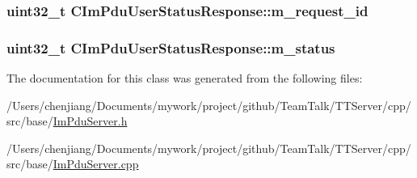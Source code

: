 \subsubsection[{m\+\_\+request\+\_\+id}]{\setlength{\rightskip}{0pt plus 5cm}uint32\+\_\+t C\+Im\+Pdu\+User\+Status\+Response\+::m\+\_\+request\+\_\+id\hspace{0.3cm}{\ttfamily [private]}}\label{class_c_im_pdu_user_status_response_af244f4f31703d4093f9d05196b5a04e3}
\hypertarget{class_c_im_pdu_user_status_response_aabcae8aef220a34ede3ddbb9ebc461b0}{}
\subsubsection[{m\+\_\+status}]{\setlength{\rightskip}{0pt plus 5cm}uint32\+\_\+t C\+Im\+Pdu\+User\+Status\+Response\+::m\+\_\+status\hspace{0.3cm}{\ttfamily [private]}}\label{class_c_im_pdu_user_status_response_aabcae8aef220a34ede3ddbb9ebc461b0}


The documentation for this class was generated from the following files\+:\begin{DoxyCompactItemize}
\item 
/\+Users/chenjiang/\+Documents/mywork/project/github/\+Team\+Talk/\+T\+T\+Server/cpp/src/base/\hyperlink{_im_pdu_server_8h}{Im\+Pdu\+Server.\+h}\item 
/\+Users/chenjiang/\+Documents/mywork/project/github/\+Team\+Talk/\+T\+T\+Server/cpp/src/base/\hyperlink{_im_pdu_server_8cpp}{Im\+Pdu\+Server.\+cpp}\end{DoxyCompactItemize}
